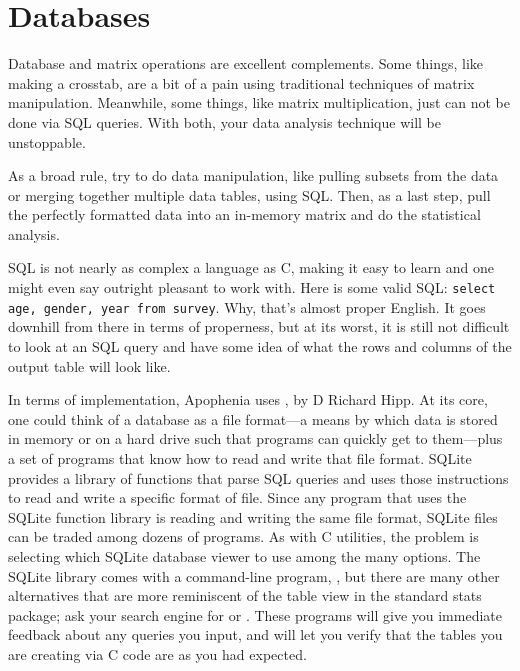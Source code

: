 \chapter{Databases} \label{sql}
\setsql %


Database and matrix operations are excellent
complements. Some things, like making a crosstab, are a bit of a
pain using traditional techniques of matrix manipulation. Meanwhile,
some things, like matrix multiplication, just can not be done via SQL
queries. With both, your data analysis technique will be unstoppable.

As a broad rule, try to do data manipulation, like pulling subsets
from the data or merging together multiple data tables, using SQL. Then,
as a last step, pull the perfectly formatted data into an in-memory matrix and
do the statistical analysis. 

SQL is not nearly as complex a language as C, making it easy to learn and
one might even say outright pleasant to work with. Here is some valid SQL:
{\tt select age, gender, year from survey}. Why, that's almost proper
English. It goes downhill from there in terms of properness, but at its
worst, it is still not difficult to look at an SQL query and have some
idea of what the rows and columns of the output table will look like.

In terms of implementation, Apophenia uses , by D Richard
Hipp. At its core, one could think of a database as a file format---a
means by which data is stored in memory or on a hard drive such that
programs can quickly get to them---plus a set of programs that know how
to read and write that file format. SQLite provides a library of functions
that parse SQL queries and uses those instructions to read and write
a specific format of file. Since any program that uses the SQLite
function library is reading and writing the same file format, SQLite
files can be traded among dozens of programs. As with C utilities,
the problem is selecting which SQLite database viewer to use among the
many options. The SQLite library comes with a command-line program,
, but there are many other alternatives that are more
reminiscent of the table view in the standard stats package; ask your
search engine for  or . These
programs will give you immediate feedback about any queries you input,
and will let you verify that the tables you are creating via C code are
as you had expected.

